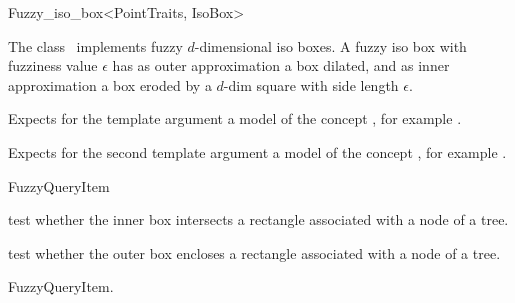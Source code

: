 

\begin{ccRefClass}{Fuzzy_iso_box<PointTraits, IsoBox>}  %


\ccDefinition
  
The class \ccRefName\ implements fuzzy $d$-dimensional iso boxes.  A
fuzzy iso box with fuzziness value $\epsilon$ has as outer
approximation a box dilated, and as inner approximation a box eroded
by a $d$-dim square with side length $\epsilon$.


\ccParameters
Expects for the template argument a model of the concept
, for example .

Expects for the second template argument  a model 
of the concept , for example .
 
\ccIsModel

FuzzyQueryItem

\ccTypes


\ccCreation
{}  %


\ccOperations


{test whether the inner box intersects a rectangle
associated with a node of a tree.}

{test whether the outer box encloses a rectangle
associated with a node of a tree.}

\ccSeeAlso

FuzzyQueryItem.

\end{ccRefClass}


